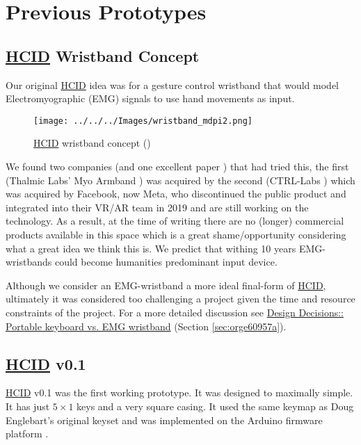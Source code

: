 \documentclass[logo,bsc,singlespacing,parskip]{infthesis}
\begin{document}
\chapter{Previous Prototypes}
\label{sec:orge84985b}
\section{\hyperref[org917851e]{HCID} Wristband Concept}
\label{sec:org2fe3ca0}
Our original \hyperref[org917851e]{HCID} idea was for a gesture control wristband that would model Electromyographic (EMG) signals to use hand movements as input.

\begin{figure}[h]
\centering
\texttt{[image: ../../../Images/wristband\_mdpi2.png]}
\caption{\hyperref[org917851e]{HCID} wristband concept (\autocite{cote-allardLowCostWireless3DPrinted2019})}
\end{figure}

We found two companies (and one excellent paper \autocite{cote-allardLowCostWireless3DPrinted2019}) that had tried this, the first (Thalmic Labs' Myo Armband \autocite{MyoGestureControl}) was acquired by the second (CTRL-Labs \autocite{27CTRLlabsLinkedIn}) which was acquired by Facebook, now Meta, who discontinued the public product and integrated into their VR/AR team in 2019 and are still working on the technology.
As a result, at the time of writing there are no (longer) commercial products available in this space which is a great shame/opportunity considering what a great idea we think this is.
We predict that withing 10 years EMG-wristbands could become humanities predominant input device.

Although we consider an EMG-wristband a more ideal final-form of \hyperref[org917851e]{HCID}, ultimately it was considered too challenging a project given the time and resource constraints of the project. For a more detailed discussion see \hyperref[sec:orge60957a]{Design Decisions:: Portable keyboard vs. EMG wristband} (Section \ref{sec:orge60957a}).
\section{\hyperref[org917851e]{HCID} v0.1}
\label{sec:org139beb7}
\hyperref[org917851e]{HCID} v0.1
was the first working prototype.
It was designed to maximally simple.
It has just \(5\times1\) keys and a very square casing.
It used the same keymap as Doug Englebart's original keyset and was implemented on the Arduino firmware platform \autocite{ArduinoHome}.
\end{document}
